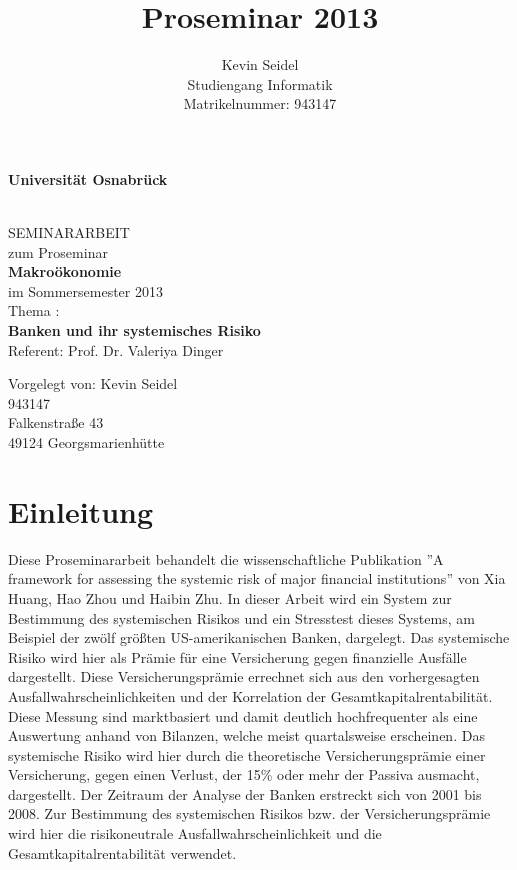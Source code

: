 \documentclass[a4paper,12pt]{scrartcl}
\title{Proseminar 2013}
\author{Kevin Seidel \\ Studiengang Informatik \\ Matrikelnummer: 943147}
\begin{document}
\begin{titlepage}
\begin{center}
\vspace*{1.5cm}
\begin{Large}
\textbf{Universität Osnabrück} \\[1cm]
\end{Large}

\noindent\hrulefill
\\[1.5cm]
SEMINARARBEIT \\[1cm]
zum Proseminar \\[1cm]
\textbf{Makroökonomie} \\[1cm]
im Sommersemester 2013 \\[1.5cm]
Thema : \\[1cm]
\textbf{Banken und ihr systemisches Risiko} \\[1cm]
Referent: Prof. Dr. Valeriya Dinger \\[2cm]

\end{center}
\begin{flushleft}
Vorgelegt von: \hfill Kevin Seidel \\
\hfill 943147 \\
\hfill Falkenstraße 43 \\
\hfill 49124 Georgsmarienhütte
\end{flushleft}

\end{titlepage}

\newpage

\setcounter{page}{2}
\tableofcontents



\newpage
{} 
\setcounter{page}{1} 


\section{Einleitung}
Diese Proseminararbeit behandelt die wissenschaftliche Publikation ''A framework for assessing the systemic risk of major financial institutions'' von Xia Huang, Hao Zhou und Haibin Zhu. In dieser Arbeit wird ein System zur Bestimmung des systemischen Risikos und ein Stresstest dieses Systems, am Beispiel der zwölf größten US-amerikanischen Banken, dargelegt. 
Das systemische Risiko wird hier als Prämie für eine Versicherung gegen finanzielle Ausfälle dargestellt. Diese Versicherungsprämie errechnet sich aus den vorhergesagten Ausfallwahrscheinlichkeiten und der Korrelation der Gesamtkapitalrentabilität. Diese Messung sind marktbasiert und damit deutlich hochfrequenter als eine Auswertung anhand von Bilanzen, welche meist quartalsweise erscheinen. 
Das systemische Risiko wird hier durch die theoretische Versicherungsprämie einer Versicherung, gegen einen Verlust, der 15\% oder mehr der Passiva ausmacht, dargestellt. Der Zeitraum der Analyse der Banken erstreckt sich von 2001 bis 2008. Zur Bestimmung des systemischen Risikos bzw. der Versicherungsprämie wird hier die risikoneutrale Ausfallwahrscheinlichkeit und die Gesamtkapitalrentabilität verwendet.
\newpage
\end{document}

